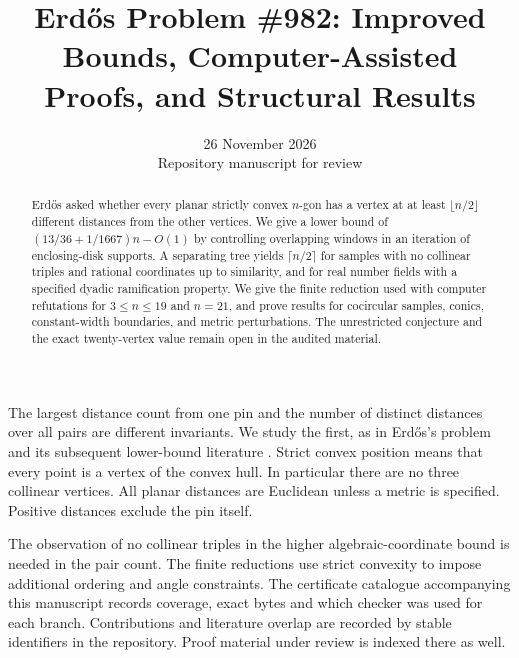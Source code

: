 \documentclass[11pt]{article}
\title{Erd\H{o}s Problem \#982: Improved Bounds, Computer-Assisted Proofs, and Structural Results}
\author{}
\date{26 November 2026 \\ Repository manuscript for review}
\begin{document}
\maketitle
\begin{abstract}
Erd\H{o}s asked whether every planar strictly convex \(n\)-gon has a vertex at at least \(\lfloor n/2\rfloor\) different distances from the other vertices. We give a lower bound of \((13/36+1/1667)n-O(1)\) by controlling overlapping windows in an iteration of enclosing-disk supports. A separating tree yields \(\lceil n/2\rceil\) for samples with no collinear triples and rational coordinates up to similarity, and for real number fields with a specified dyadic ramification property. We give the finite reduction used with computer refutations for \(3\le n\le19\) and \(n=21\), and prove results for cocircular samples, conics, constant-width boundaries, and metric perturbations. The unrestricted conjecture and the exact twenty-vertex value remain open in the audited material.
\end{abstract}

The largest distance count from one pin and the number of distinct distances over all pairs are different invariants. We study the first, as in Erd\H{o}s's problem and its subsequent lower-bound literature \cite{erdos,moser,ef,nppz,kominers}. Strict convex position means that every point is a vertex of the convex hull. In particular there are no three collinear vertices. All planar distances are Euclidean unless a metric is specified. Positive distances exclude the pin itself.

The observation of no collinear triples in the higher algebraic-coordinate bound is needed in the pair count. The finite reductions use strict convexity to impose additional ordering and angle constraints. The certificate catalogue accompanying this manuscript records coverage, exact bytes and which checker was used for each branch. Contributions and literature overlap are recorded by stable identifiers in the repository. Proof material under review is indexed there as well.












\end{document}
